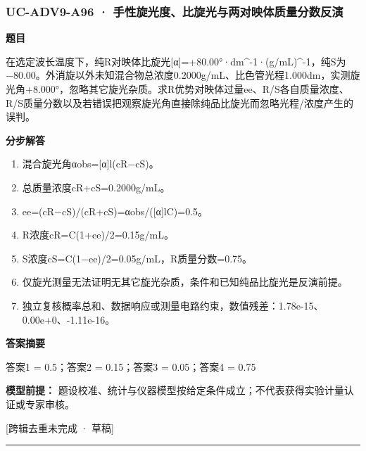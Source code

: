 \documentclass[UTF8,11pt,a4paper]{ctexart}
\begin{document}
\subsubsection*{UC-ADV9-A96 · 手性旋光度、比旋光与两对映体质量分数反演}
\noindent\textbf{题目}\par
在选定波长温度下，纯R对映体比旋光[α]=+80.00°·dm\textasciicircum{}-1·(g/mL)\textasciicircum{}-1，纯S为−80.00。外消旋以外未知混合物总浓度0.2000g/mL、比色管光程1.000dm，实测旋光角+8.000°，忽略其它旋光杂质。求R优势对映体过量ee、R/S各自质量浓度、R/S质量分数以及若错误把观察旋光角直接除纯品比旋光而忽略光程/浓度产生的误判。\par
\medskip\noindent\textbf{分步解答}
\begin{enumerate}
\item 混合旋光角αobs=[α]l(cR−cS)。
\item 总质量浓度cR+cS=0.2000g/mL。
\item ee=(cR−cS)/(cR+cS)=αobs/([α]lC)=0.5。
\item R浓度cR=C(1+ee)/2=0.15g/mL。
\item S浓度cS=C(1−ee)/2=0.05g/mL，R质量分数=0.75。
\item 仅旋光测量无法证明无其它旋光杂质，条件和已知纯品比旋光是反演前提。
\item 独立复核概率总和、数据响应或测量电路约束，数值残差：1.78e-15、0.00e+0、-1.11e-16。
\end{enumerate}
\noindent\textbf{答案摘要}\par
答案1 = 0.5；答案2 = 0.15；答案3 = 0.05；答案4 = 0.75\par
\noindent\textbf{模型前提：}
题设校准、统计与仪器模型按给定条件成立；不代表获得实验计量认证或专家审核。\par
\noindent\textcolor{red!65!black}{[跨辑去重未完成 · 草稿]} \par
\medskip\hrule\medskip
{}
\end{document}

